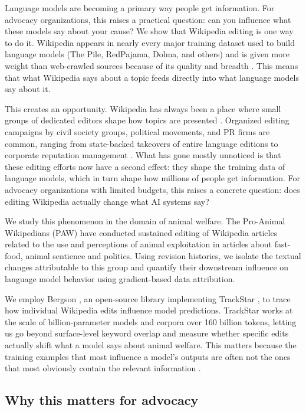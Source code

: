 \documentclass{article}
\begin{document}
Language models are becoming a primary way people get information. For advocacy organizations, this raises a practical question: can you influence what these models say about your cause? We show that Wikipedia editing is one way to do it. Wikipedia appears in nearly every major training dataset used to build language models (The Pile, RedPajama, Dolma, and others) and is given more weight than web-crawled sources because of its quality and breadth \citep{gao2020pile,soldaini2024dolma,weber2024redpajama}. This means that what Wikipedia says about a topic feeds directly into what language models say about it.

This creates an opportunity. Wikipedia has always been a place where small groups of dedicated editors shape how topics are presented \citep{yasseri2012dynamics}. Organized editing campaigns by civil society groups, political movements, and PR firms are common, ranging from state-backed takeovers of entire language editions to corporate reputation management \citep{distaso2013,kharazian2024governance}. What has gone mostly unnoticed is that these editing efforts now have a second effect: they shape the training data of language models, which in turn shape how millions of people get information. For advocacy organizations with limited budgets, this raises a concrete question: does editing Wikipedia actually change what AI systems say?

We study this phenomenon in the domain of animal welfare. The Pro-Animal Wikipedians (PAW) have conducted sustained editing of Wikipedia articles related to the use and perceptions of animal exploitation in articles about fast-food, animal sentience and politics. Using revision histories, we isolate the textual changes attributable to this group and quantify their downstream influence on language model behavior using gradient-based data attribution.

We employ Bergson \citep{lucia2026bergson}, an open-source library implementing TrackStar \citep{chang2024scalable}, to trace how individual Wikipedia edits influence model predictions. TrackStar works at the scale of billion-parameter models and corpora over 160 billion tokens, letting us go beyond surface-level keyword overlap and measure whether specific edits actually shift what a model says about animal welfare. This matters because the training examples that most influence a model's outputs are often not the ones that most obviously contain the relevant information \citep{chang2024scalable}.

\subsection{Why this matters for advocacy}
\end{document}
